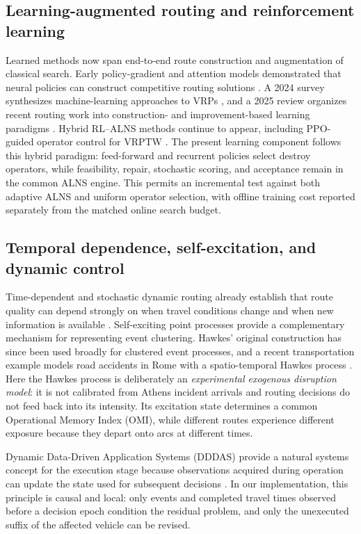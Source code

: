 \documentclass[preprint,12pt]{elsarticle}
\newcommand{\1}{\mathbf{1}}
\begin{document}
\subsection{Learning-augmented routing and reinforcement learning}

Learned methods now span end-to-end route construction and augmentation of
classical search. Early policy-gradient and attention models demonstrated that
neural policies can construct competitive routing solutions
\citep{Nazari2018RL, Kool2019Attention}. A 2024 survey synthesizes machine-learning
approaches to VRPs \citep{Bogyrbayeva2024MLVRP}, and a 2025 review organizes recent
routing work into construction- and improvement-based learning paradigms
\citep{ZhouEtAl2025LearningRouting}. Hybrid RL--ALNS methods continue to appear,
including PPO-guided operator control for VRPTW \citep{WangEtAl2025RLALNS}.
The present learning component follows this hybrid paradigm: feed-forward and
recurrent policies select destroy operators, while feasibility, repair, stochastic
scoring, and acceptance remain in the common ALNS engine. This permits an
incremental test against both adaptive ALNS and uniform operator selection, with
offline training cost reported separately from the matched online search budget.

\subsection{Temporal dependence, self-excitation, and dynamic control}

Time-dependent and stochastic dynamic routing already establish that route quality
can depend strongly on when travel conditions change and when new information is
available \citep{ZhangVanWoensel2023, Adamo2024}. Self-exciting point processes
provide a complementary mechanism for representing event clustering. Hawkes'
original construction \citep{hawkes1971} has since been used broadly for clustered
event processes, and a recent transportation example models road accidents in Rome
with a spatio-temporal Hawkes process \citep{AlaimoDiLoroEtAl2025}.
Here the Hawkes process is deliberately an \emph{experimental exogenous disruption
model}: it is not calibrated from Athens incident arrivals and routing decisions do
not feed back into its intensity. Its excitation state determines a common
Operational Memory Index (OMI), while different routes experience different exposure
because they depart onto arcs at different times.

Dynamic Data-Driven Application Systems (DDDAS) provide a natural systems concept
for the execution stage because observations acquired during operation can update
the state used for subsequent decisions \citep{Darema2004DDDAS}. In our
implementation, this principle is causal and local: only events and completed travel
times observed before a decision epoch condition the residual problem, and only the
unexecuted suffix of the affected vehicle can be revised.
\end{document}

